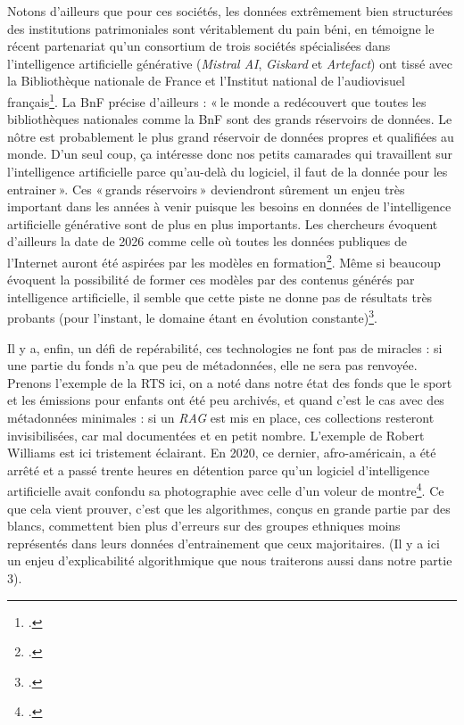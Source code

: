 Notons d’ailleurs que pour ces sociétés, les données extrêmement bien structurées des institutions patrimoniales sont véritablement du pain béni, en témoigne le récent partenariat qu’un consortium de trois sociétés spécialisées dans l’intelligence artificielle générative (\textit{Mistral AI}, \textit{Giskard} et \textit{Artefact}) ont tissé avec la Bibliothèque nationale de France et l’Institut national de l’audiovisuel français\footcite{clavey_bnf_2024}. La BnF précise d’ailleurs : « le monde a redécouvert que toutes les bibliothèques nationales comme la BnF sont des grands réservoirs de données. Le nôtre est probablement le plus grand réservoir de données propres et qualifiées au monde. D’un seul coup, ça intéresse donc nos petits camarades qui travaillent sur l’intelligence artificielle parce qu’au-delà du logiciel, il faut de la donnée pour les entrainer ». Ces « grands réservoirs » deviendront sûrement un enjeu très important dans les années à venir puisque les besoins en données de l’intelligence artificielle générative sont de plus en plus importants. Les chercheurs évoquent d’ailleurs la date de 2026 comme celle où toutes les données publiques de l’Internet auront été aspirées par les modèles en formation\footcite{forbes_internet_2024}. Même si beaucoup évoquent la possibilité de former ces modèles par des contenus générés par intelligence artificielle, il semble que cette piste ne donne pas de résultats très probants (pour l’instant, le domaine étant en évolution constante)\footcite{noauthor_entrainer_nodate}.

Il y a, enfin, un défi de repérabilité, ces technologies ne font pas de miracles : si une partie du fonds n’a que peu de métadonnées, elle ne sera pas renvoyée. Prenons l’exemple de la RTS ici, on a noté dans notre état des fonds que le sport et les émissions pour enfants ont été peu archivés, et quand c’est le cas avec des métadonnées minimales : si un \textit{RAG} est mis en place, ces collections resteront invisibilisées, car mal documentées et en petit nombre. L’exemple de Robert Williams est ici tristement éclairant. En 2020, ce dernier, afro-américain, a été arrêté et a passé trente heures en détention parce qu’un logiciel d’intelligence artificielle avait confondu sa photographie avec celle d’un voleur de montre\footcite{noauthor_etats-unis_nodate}. Ce que cela vient prouver, c’est que les algorithmes, conçus en grande partie par des blancs, commettent bien plus d’erreurs sur des groupes ethniques moins représentés dans leurs données d’entrainement que ceux majoritaires. (Il y a ici un enjeu d’explicabilité algorithmique que nous traiterons aussi dans notre partie 3).

